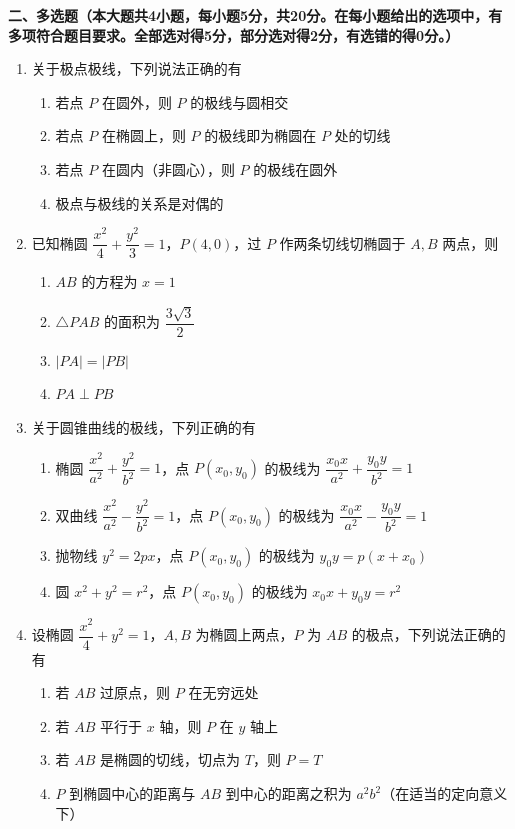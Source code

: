 \documentclass[12pt, a4paper]{ctexart}
\newcommand{\score}[1]{\hfill\makebox[2cm][l]{(#1分)}}
\begin{document}
\noindent\textbf{二、多选题（本大题共4小题，每小题5分，共20分。在每小题给出的选项中，有多项符合题目要求。全部选对得5分，部分选对得2分，有选错的得0分。）}

\vspace{0.3cm}

\begin{enumerate}[resume]
\item 关于极点极线，下列说法正确的有\score{5}
\begin{enumerate}[label=\Alph*.]
\item 若点 $P$ 在圆外，则 $P$ 的极线与圆相交
\item 若点 $P$ 在椭圆上，则 $P$ 的极线即为椭圆在 $P$ 处的切线
\item 若点 $P$ 在圆内（非圆心），则 $P$ 的极线在圆外
\item 极点与极线的关系是对偶的
\end{enumerate}

\item 已知椭圆 $\dfrac{x^2}{4} + \dfrac{y^2}{3} = 1$，$P(4, 0)$，过 $P$ 作两条切线切椭圆于 $A, B$ 两点，则\score{5}
\begin{enumerate}[label=\Alph*.]
\item $AB$ 的方程为 $x = 1$
\item $\triangle PAB$ 的面积为 $\dfrac{3\sqrt{3}}{2}$
\item $|PA| = |PB|$
\item $PA \perp PB$
\end{enumerate}

\item 关于圆锥曲线的极线，下列正确的有\score{5}
\begin{enumerate}[label=\Alph*.]
\item 椭圆 $\dfrac{x^2}{a^2} + \dfrac{y^2}{b^2} = 1$，点 $P(x_0, y_0)$ 的极线为 $\dfrac{x_0 x}{a^2} + \dfrac{y_0 y}{b^2} = 1$
\item 双曲线 $\dfrac{x^2}{a^2} - \dfrac{y^2}{b^2} = 1$，点 $P(x_0, y_0)$ 的极线为 $\dfrac{x_0 x}{a^2} - \dfrac{y_0 y}{b^2} = 1$
\item 抛物线 $y^2 = 2px$，点 $P(x_0, y_0)$ 的极线为 $y_0 y = p(x + x_0)$
\item 圆 $x^2 + y^2 = r^2$，点 $P(x_0, y_0)$ 的极线为 $x_0 x + y_0 y = r^2$
\end{enumerate}

\item 设椭圆 $\dfrac{x^2}{4} + y^2 = 1$，$A, B$ 为椭圆上两点，$P$ 为 $AB$ 的极点，下列说法正确的有\score{5}
\begin{enumerate}[label=\Alph*.]
\item 若 $AB$ 过原点，则 $P$ 在无穷远处
\item 若 $AB$ 平行于 $x$ 轴，则 $P$ 在 $y$ 轴上
\item 若 $AB$ 是椭圆的切线，切点为 $T$，则 $P = T$
\item $P$ 到椭圆中心的距离与 $AB$ 到中心的距离之积为 $a^2 b^2$（在适当的定向意义下）
\end{enumerate}

\end{enumerate}
\end{document}
